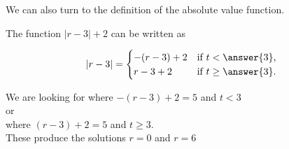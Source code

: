 \documentclass{ximera}
\begin{document}
\begin{example}
\begin{image}
\end{image}



We can also turn to the definition of the absolute value function.


The function $|r-3| + 2$ can be written as 



\[
|r-3| = 
\begin{cases}
  -(r-3) + 2  & \text{if $t<\answer{3}$,}\\
   r-3 + 2  & \text{if $t\ge \answer{3}$}.
\end{cases}
\]


We are looking for where $-(r-3) + 2 = 5$ and $ t < 3$  \\

or \\

where $(r-3) + 2 = 5$ and $t \ge 3$.  \\


These produce the solutions $r=0$ and $r=6$










\end{example}
\end{document}
